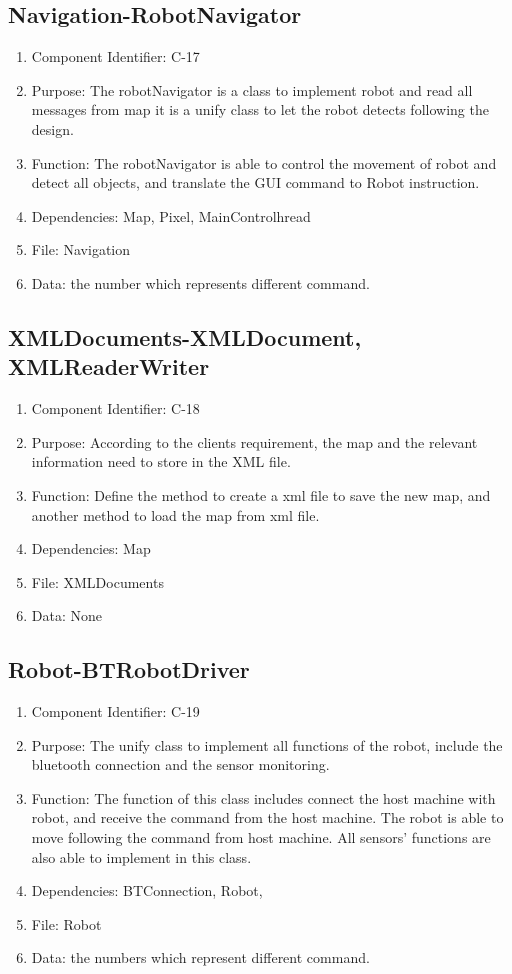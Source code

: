 \documentclass[11pt, a4paper]{report}
\begin{document}
\subsection{Navigation-RobotNavigator}
\begin{enumerate}
\item Component Identifier: C-17
\item Purpose: The robotNavigator is a class to implement robot and read all messages from map it is a unify class to let the robot detects following the design. 
\item Function: The robotNavigator is able to control the movement of robot and detect all objects, and translate the GUI command to Robot instruction.   
\item Dependencies: Map, Pixel, MainControlhread
\item File: Navigation
\item Data: the number which represents different command.
\end{enumerate}

\subsection{XMLDocuments-XMLDocument, XMLReaderWriter}
\begin{enumerate}
\item Component Identifier: C-18
\item Purpose: According to the clients requirement, the map and the relevant information need to store in the XML file. 
\item Function: Define the method to create a xml file to save the new map, and another method to load the map from xml file.
\item Dependencies: Map
\item File: XMLDocuments
\item Data: None
\end{enumerate}

\subsection{Robot-BTRobotDriver}
\begin{enumerate}
\item Component Identifier: C-19
\item Purpose: The unify class to implement all functions of the robot, include the bluetooth connection and the sensor monitoring.
\item Function: The function of this class includes connect the host machine with robot, and receive the command from the host machine. The robot is able to move following the command from host machine. All sensors' functions are also able to implement in this class. 
\item Dependencies: BTConnection, Robot,
\item File: Robot
\item Data: the numbers which represent different command.
\end{enumerate}
\end{document}
